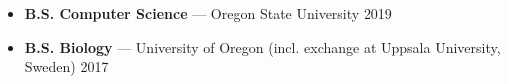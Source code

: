 \begin{itemize}
    \item \textbf{B.S. Computer Science} --- Oregon State University \hfill \textcolor{my-grey}{2019}
    \item \textbf{B.S. Biology} --- University of Oregon (incl. exchange at Uppsala University, Sweden) \hfill \textcolor{my-grey}{2017}
\end{itemize}
